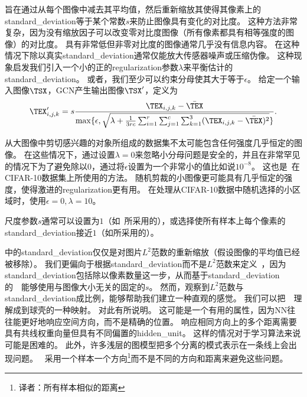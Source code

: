 旨在通过从每个图像中减去其平均值，然后重新缩放其使得其像素上的\gls{standard_deviation}等于某个常数$s$来防止图像具有变化的对比度。
这种方法非常复杂，因为没有缩放因子可以改变零对比度图像（所有像素都具有相等强度的图像）的对比度。
具有非常低但非零对比度的图像通常几乎没有信息内容。
在这种情况下除以真实\gls{standard_deviation}通常仅能放大传感器噪声或压缩伪像。
这种现象启发我们引入一个小的正的\gls{regularization}参数$\lambda$来平衡估计的\gls{standard_deviation}。
或者，我们至少可以约束分母使其大于等于$\epsilon$。
给定一个输入图像$\TSX$，\gls{GCN}产生输出图像$\TSX'$，定义为
\begin{align}
\label{eqn:123}
\TEX'_{i,j,k} = s\frac{\TEX_{i,j,k} - \bar{\TEX}}{\max\{ \epsilon, \sqrt{ \lambda + {\frac{1}{3rc}\sum_{i=1}^{r}\sum_{j=1}^{c}\sum_{k=1}^{3}} (\TEX_{i,j,k} - \bar{\TEX} )^2} \}}.
\end{align}


从大图像中剪切感兴趣的对象所组成的数据集不太可能包含任何强度几乎恒定的图像。
在这些情况下，通过设置$\lambda = 0$来忽略小分母问题是安全的，并且在非常罕见的情况下为了避免除以$0$，通过将$\epsilon$设置为一个非常小的值比如说$10^{-8}$。
这也是~\citet{Goodfellow+al-arxiv-2013}在CIFAR-10数据集上所使用的方法。
随机剪裁的小图像更可能具有几乎恒定的强度，使得激进的\gls{regularization}更有用。
在处理从CIFAR-10数据中随机选择的小区域时，\citet{Coates2011}使用$\epsilon = 0, \lambda = 10$。

尺度参数$s$通常可以设置为$1$（如~\citet{Coates2011}所采用的），或选择使所有样本上每个像素的\gls{standard_deviation}接近$1$（如\citet{Goodfellow+al-arxiv-2013}所采用的）。


中的\gls{standard_deviation}仅仅是对图片$L^2$范数的重新缩放（假设图像的平均值已经被移除）。
我们更偏向于根据\gls{standard_deviation}而不是$L^2$范数来定义~，因为\gls{standard_deviation}包括除以像素数量这一步，从而基于\gls{standard_deviation}的~~能够使用与图像大小无关的固定的$s$。
然而，观察到$L^2$范数与\gls{standard_deviation}成比例，能够帮助我们建立一种直观的感觉。
我们可以把~~理解成到球壳的一种映射。
对此有所说明。
这可能是一个有用的属性，因为\gls{NN}往往能更好地响应空间方向，而不是精确的位置。
响应相同方向上的多个距离需要具有共线权重向量但具有不同偏置的\gls{hidden_unit}。
这样的情况对于学习算法来说可能是困难的。
此外，许多浅层的图模型把多个分离的模式表示在一条线上会出现问题。
~采用一个样本一个方向\footnote{译者：所有样本相似的距离}而不是不同的方向和距离来避免这些问题。

